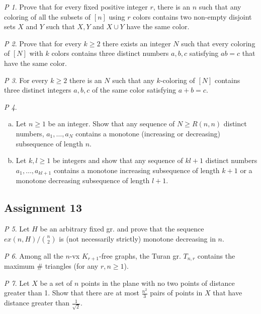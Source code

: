 \documentclass[11pt, fleqn, a4paper, landscape]{article}
\theoremstyle{plain} %
\theoremstyle{remark} %
\newtheorem{problem}{P}
\theoremstyle{definition} %
\begin{document}
\begin{multicols}{5}
\begin{problem}
Prove that for every fixed positive integer $r$, there is an $n$ such that any coloring of all the subsets of $[n] $ using $r$ colors contains two non-empty disjoint sets $X$ and $Y$ such that $X, Y $ and $X \cup Y$ have the same color.
\end{problem}

\begin{problem}
Prove that for every $k \ge 2$ there exists an integer $N$ such that every coloring of $[N]$ with $k$ colors contains three distinct numbers $a, b, c$ satisfying $ab = c$ that have the same color.
\end{problem}

\begin{problem}
For every $k\ge 2$ there is an $N$ such that any $k$-coloring of $[N]$ contains three distinct integers $a, b, c$ of the same color satisfying $a + b = c.$
\end{problem}

\begin{problem}
\begin{enumerate}[(a)]
\item Let $n\ge 1$ be an integer. Show that any sequence of $N\ge R(n, n)$  distinct numbers, $a_1,\dots, a_N$ contains a monotone (increasing or decreasing) subsequence of length $n$.
\item Let $k, l \ge1$ be integers and show that any sequence of $kl+1$ distinct numbers $a_1,\dots, a_{kl+1}$ contains a monotone increasing subsequence of length $k + 1$ or a monotone decreasing
subsequence of length $l + 1$.
\end{enumerate}
\end{problem}

\subsection{Assignment 13}

\begin{problem}
Let $H$ be an arbitrary fixed gr. and prove that the sequence $ex(n,H)/\binom{n}{2}$ is (not necessarily strictly) monotone decreasing in $n$.
\end{problem}

\begin{problem}
Among all the $n$-vx $K_{r+1}$-free graphs, the Turan gr. $T_{n,r}$ contains the maximum \# triangles (for any $r, n \ge 1$).
\end{problem}

\begin{problem}
Let $X$ be a set of $n$ points in the plane with no two points of distance greater than 1. Show that there are at most $\frac{n^2}{3}$ pairs of points in $X$ that have distance greater than $\frac{1}{\sqrt{2}}$.
\end{problem}


\end{multicols}
\end{document}

